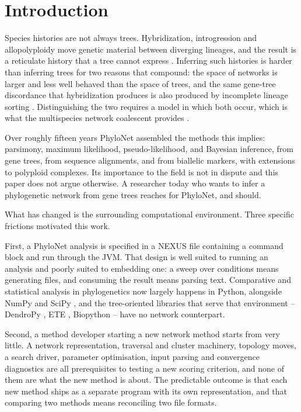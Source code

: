 \section{Introduction}
\label{sec:introduction}

Species histories are not always trees. Hybridization, introgression and
allopolyploidy move genetic material between diverging lineages, and the result
is a reticulate history that a tree cannot express
\cite{TODO_networks_review}. Inferring such histories is harder than inferring
trees for two reasons that compound: the space of networks is larger and less
well behaved than the space of trees, and the same gene-tree discordance that
hybridization produces is also produced by incomplete lineage sorting
\cite{TODO_ILS_review}. Distinguishing the two requires a model in which both
occur, which is what the multispecies network coalescent provides
\cite{TODO_MSNC}.

Over roughly fifteen years PhyloNet \cite{Than2008PhyloNet,
Wen2018InferringPhyloNet} assembled the methods this implies: parsimony,
maximum likelihood, pseudo-likelihood, and Bayesian inference, from gene trees,
from sequence alignments, and from biallelic markers, with extensions to
polyploid complexes. Its importance to the field is not in dispute and this
paper does not argue otherwise. A researcher today who wants to infer a
phylogenetic network from gene trees reaches for PhyloNet, and should.

What has changed is the surrounding computational environment. Three specific
frictions motivated this work.

First, a PhyloNet analysis is specified in a NEXUS file containing a command
block and run through the JVM. That design is well suited to running an analysis
and poorly suited to embedding one: a sweep over conditions means generating
files, and consuming the result means parsing text. Comparative and statistical
analysis in phylogenetics now largely happens in Python, alongside NumPy
\cite{Harris2020NumPy} and SciPy \cite{Virtanen2020SciPy}, and the tree-oriented
libraries that serve that environment -- DendroPy \cite{Sukumaran2010DendroPy},
ETE \cite{HuertaCepas2016ETE3}, Biopython \cite{Cock2009Biopython} -- have no
network counterpart.

Second, a method developer starting a new network method starts from very little.
A network representation, traversal and cluster machinery, topology moves, a
search driver, parameter optimisation, input parsing and convergence diagnostics
are all prerequisites to testing a new scoring criterion, and none of them are
what the new method is about. The predictable outcome is that each new method
ships as a separate program with its own representation, and that comparing two
methods means reconciling two file formats.

